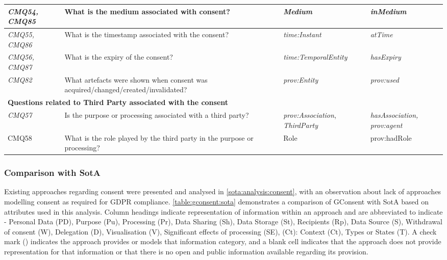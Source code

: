 \begin{center}
\begin{tabularx}{\textwidth}{|p{1cm}|X|p{4cm}|p{3.5cm}|}
\textit{CMQ54, CMQ85} & What is the medium associated with consent? & \textit{Medium} & \textit{inMedium} \\ \hline
\textit{CMQ55, CMQ86} & What is the timestamp associated with the consent? & \textit{time:Instant} & \textit{atTime} \\ \hline
\textit{CMQ56, CMQ87} & What is the expiry of the consent? & \textit{time:TemporalEntity} & \textit{hasExpiry} \\ \hline
\textit{CMQ82} & What artefacts were shown when consent was acquired/changed/created/invalidated? & \textit{prov:Entity} & \textit{prov:used} \\ \hline
\multicolumn{4}{|l|}{\textbf{Questions related to Third Party associated with the consent}} \\ \hline
\textit{CMQ57} & Is the purpose or processing associated with a third party? & \textit{prov:Association}, \textit{ThirdParty} & \textit{hasAssociation, prov:agent} \\ \hline
CMQ58 & What is the role played by the third party in the purpose or processing? & Role & prov:hadRole \\
\bottomrule
\end{tabularx}
\end{center}

\subsubsection{Comparison with SotA}
Existing approaches regarding consent were presented and analysed in \autoref{sota:analysis:consent}, with an observation about lack of approaches modelling consent as required for GDPR compliance.
\autoref{table:gconsent:sota} demonstrates a comparison of GConsent with SotA based on attributes used in this analysis.
Column headings indicate representation of information within an approach and are abbreviated to indicate - Personal Data (PD), Purpose (Pu), Processing (Pr), Data Sharing (Sh), Data Storage (St), Recipients (Rp), Data Source (S), Withdrawal of consent (W), Delegation (D), Visualisation (V), Significant effects of processing (SE), (Ct): Context (Ct), Types or States (T).
A check mark (\cmark) indicates the approach provides or models that information category, and a blank cell indicates that the approach does not provide representation for that information or that there is no open and public information available regarding its provision.

